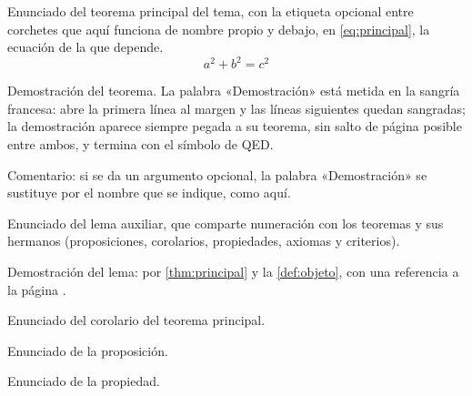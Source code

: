 \begin{teorema}\label{thm:principal}
    Enunciado del teorema principal del tema, con la etiqueta opcional
    entre corchetes que aquí funciona de nombre propio y debajo, en
    \cref{eq:principal}, la ecuación de la que depende.
    \begin{equation}\label{eq:principal}
        a^2 + b^2 = c^2
    \end{equation}
\end{teorema}

\begin{demostracion}
    Demostración del teorema. La palabra «Demostración» está metida
    en la sangría francesa: abre la primera línea al margen y las
    líneas siguientes quedan sangradas; la demostración aparece
    siempre pegada a su teorema, sin salto de página posible entre
    ambos, y termina con el símbolo de QED.
\end{demostracion}

\begin{demostracion}
    Comentario: si se da un argumento opcional, la palabra
    «Demostración» se sustituye por el nombre que se indique, como
    aquí.
\end{demostracion}

\begin{lema}\label{lem:auxiliar}
    Enunciado del lema auxiliar, que comparte numeración con los
    teoremas y sus hermanos (proposiciones, corolarios, propiedades,
    axiomas y criterios).
\end{lema}

\begin{demostracion}
    Demostración del lema: por \cref{thm:principal} y la
    \cref{def:objeto}, con una referencia a la página .
\end{demostracion}

\begin{corolario}
    Enunciado del corolario del teorema principal.
\end{corolario}

\begin{proposicion}
    Enunciado de la proposición.
\end{proposicion}

\begin{propiedad}
    Enunciado de la propiedad.
\end{propiedad}

